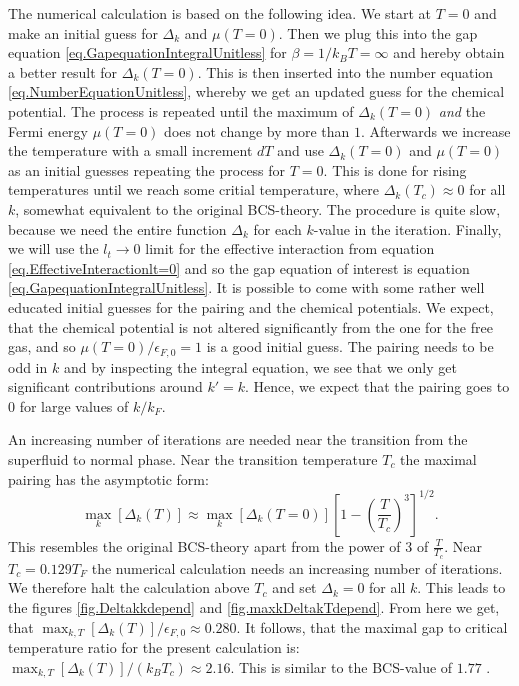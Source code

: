The numerical calculation is based on the following idea. We start at $T = 0$ and make an initial guess for $\Delta_k$ and $\mu(T=0)$. Then we plug this into the gap equation \eqref{eq.GapequationIntegralUnitless} for $\beta = 1/k_BT = \infty$ and hereby obtain a better result for $\Delta_k(T=0)$. This is then inserted into the number equation \eqref{eq.NumberEquationUnitless}, whereby we get an updated guess for the chemical potential. The process is repeated until the maximum of $\Delta_k(T=0)$ \textit{and} the Fermi energy $\mu( T=0 )$ does not change by more than $1$\textperthousand. Afterwards we increase the temperature with a small increment $dT$ and use $\Delta_k(T=0)$ and $\mu( T=0 )$ as an initial guesses repeating the process for $T=0$. This is done for rising temperatures until we reach some critial temperature, where $\Delta_k(T_c)\approx 0$ for all $k$, somewhat equivalent to the original BCS-theory\cite{Tinkham,LandauStatPhys2,PlischkeStatPhys}. The procedure is quite slow, because we need the entire function $\Delta_k$ for each $k$-value in the iteration. Finally, we will use the $l_t \to 0$ limit for the effective interaction from equation \eqref{eq.EffectiveInteractionlt=0} and so the gap equation of interest is equation \eqref{eq.GapequationIntegralUnitless}. It is possible to come with some rather well educated initial guesses for the pairing and the chemical potentials. We expect, that the chemical potential is not altered significantly from the one for the free gas, and so $\mu(T = 0)/\epsilon_{F,0} = 1$ is a good initial guess. The pairing needs to be odd in $k$ and by inspecting the integral equation, we see that we only get significant contributions around $k' = k$. Hence, we expect that the pairing goes to 0 for large values of $k/k_F$.  

An increasing number of iterations are needed near the transition from the superfluid to normal phase. Near the transition temperature $T_c$ the maximal pairing has the asymptotic form:
\begin{equation}
\max_{k}[\Delta_k(T)] \approx \max_k[\Delta_{k}(T=0)]\left[1 - \left(\frac{T}{T_c}\right)^3\right]^{1/2}. 
\label{eq.maxpairingasymp}
\end{equation}
This resembles the original BCS-theory apart from the power of 3 of $\frac{T}{T_c}$. Near $T_c = 0.129 T_F$ the numerical calculation needs an increasing number of iterations. We therefore halt the calculation above $T_c$ and set $\Delta_k = 0$ for all $k$. This leads to the figures \ref{fig.Deltakkdepend} and \ref{fig.maxkDeltakTdepend}. From here we get, that $\max_{k,T}[\Delta_k(T)]/\epsilon_{F,0} \approx 0.280$. It follows, that the maximal gap to critical temperature ratio for the present calculation is: $\max_{k,T}[\Delta_k(T)]/(k_B T_c) \approx 2.16$. This is similar to the BCS-value of $1.77$ \cite{BruusFlensberg}.  

